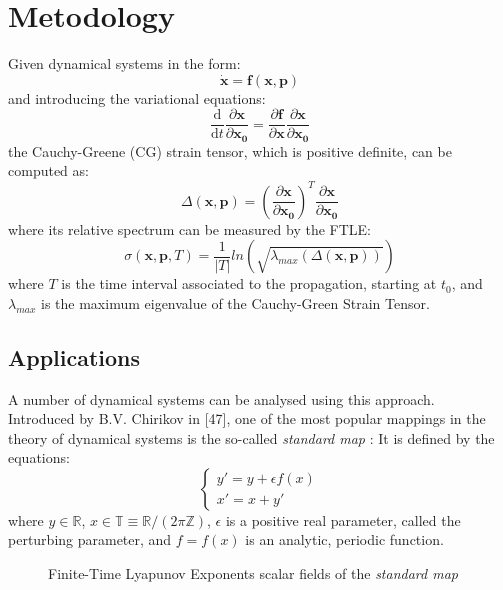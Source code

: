 \documentclass{juliacon}
\newcommand{\drv}{\textrm{d}}
\begin{document}
\section{Metodology}
Given dynamical systems in the form:
\begin{equation}
    \dot{\mathbf{x}}=\mathbf{f}(\mathbf{x}, \mathbf{p})
\end{equation}
and introducing the variational equations:
\begin{equation}
    \frac{\drv}{\drv t} \frac{\partial \mathbf{x} }{\partial \mathbf{x_0}} = \frac{\partial \mathbf{f}}{\partial \mathbf{x}}\frac{\partial \mathbf{x}}{\partial \mathbf{x_0}}
\end{equation}
the Cauchy-Greene (CG) strain tensor, which is positive definite, can be computed as:
\begin{equation}
    \Delta(\mathbf{x}, \mathbf{p}) = \left( \frac{\partial \mathbf{x}}{\partial \mathbf{x_0}}\right)^T \frac{\partial \mathbf{x}}{\partial \mathbf{x_0}}
\end{equation}
where its relative spectrum can be measured by the FTLE:
\begin{equation}
    \sigma(\mathbf{x}, \mathbf{p}, T)=\frac{1}{|T|}ln(\sqrt{\lambda_{max}(\Delta(\mathbf{x}, \mathbf{p}))})
\end{equation}
where $T$ is the time interval associated to the propagation, starting at $t_0$, and $\lambda_{max}$ is the maximum eigenvalue of the Cauchy-Green Strain Tensor.

\subsection{Applications}
A number of dynamical systems can be analysed using this approach. \\
Introduced by B.V. Chirikov in [47], one of the most popular mappings in the theory of dynamical systems is the so-called \emph{standard map} \cite{celletti}:
It is defined by the equations:
\begin{equation}
    \begin{cases}
    y'=y+\epsilon f(x) \\
    x'=x+y'
\end{cases}
\end{equation}
where $y\in\mathbb{R}$, $x\in\mathbb{T}\equiv \mathbb{R}/(2\pi\mathbb{Z})$, $\epsilon$ is a positive real parameter, called the perturbing parameter, and $f = f(x)$ is an analytic, periodic function.
\begin{figure}[h]
    \centering
    \caption{Finite-Time Lyapunov Exponents scalar fields of the \emph{standard map}}
    \label{fig:stdmap}
\end{figure}
\end{document}
